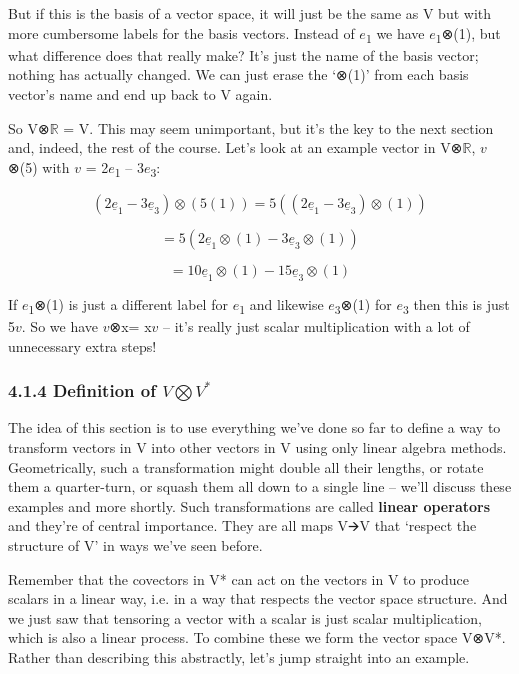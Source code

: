 \documentclass[oneside,english]{amsbook}
\numberwithin{section}{chapter}
\theoremstyle{plain}
\theoremstyle{definition}
\begin{document}
But if this is the basis of a vector space, it will just be the same as
V but with more cumbersome labels for the basis vectors. Instead of
$e$\textsubscript{1} we have $e$\textsubscript{1}⊗(1), but what
difference does that really make? It's just the name of the basis
vector; nothing has actually changed. We can just erase the `⊗(1)'
from each basis vector's name and end up back to V again.

So V⊗$\mathbb{R}$ = V. This may seem unimportant, but it's the key to the
next section and, indeed, the rest of the course. Let's look at an
example vector in V⊗$\mathbb{R}$, $v$⊗(5) with $v$ =
2$e$\textsubscript{1} -- 3$e$\textsubscript{3}:

\[\left( 2{\underline{e}}_{1} - 3{\underline{e}}_{3} \right) \otimes \left( 5(1) \right) = 5\left( \left( 2{\underline{e}}_{1} - 3{\underline{e}}_{3} \right) \otimes (1) \right)\]

\[= 5\left( 2{\underline{e}}_{1} \otimes (1) - 3{\underline{e}}_{3} \otimes (1) \right)\]

\[= 10{\underline{e}}_{1} \otimes (1) - 15{\underline{e}}_{3} \otimes (1)\]

If $e$\textsubscript{1}⊗(1) is just a different label for
$e$\textsubscript{1} and likewise $e$\textsubscript{3}⊗(1) for
$e$\textsubscript{3} then this is just 5$v$. So we have $v$⊗x=
x$v$ -- it's really just scalar multiplication with a lot of
unnecessary extra steps!

\subsubsection{\texorpdfstring{4.1.4 Definition of
		\(V\bigotimes V^{*}\)}{4.1.4 Definition of V\textbackslash bigotimes V\^{}\{*\}}}\label{definition-of-vbigotimes-v-1}

The idea of this section is to use everything we've done so far to
define a way to transform vectors in V into other vectors in V using
only linear algebra methods. Geometrically, such a transformation might
double all their lengths, or rotate them a quarter-turn, or squash them
all down to a single line -- we'll discuss these examples and more
shortly. Such transformations are called \textbf{linear operators} and
they're of central importance. They are all maps V🡪V that `respect the
structure of V' in ways we've seen before.

Remember that the covectors in V* can act on the vectors in V to produce
scalars in a linear way, i.e. in a way that respects the vector space
structure. And we just saw that tensoring a vector with a scalar is just
scalar multiplication, which is also a linear process. To combine these
we form the vector space V⊗V*. Rather than describing this abstractly,
let's jump straight into an example.
\end{document}
